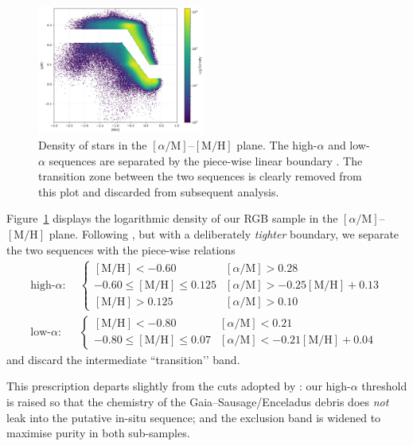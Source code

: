 \documentclass[a4paper,12pt]{article}
\begin{document}
\begin{figure}[h]
    \centering
    \includegraphics[width=0.49\textwidth]{../figures/alpha_vs_metalicity.png}
    \caption{Density of stars in the $[\alpha/\mathrm{M}]$–$[\mathrm{M/H}]$ plane.
             The high-$\alpha$ and low-$\alpha$ sequences are separated by the
             piece-wise linear boundary . The transition zone
             between the two sequences is clearly removed from this plot and discarded from
             subsequent analysis.}
    \label{fig:alphametal}
\end{figure}


  
Figure~\ref{fig:alphametal} displays the logarithmic density of our
RGB sample in the $[\alpha/\mathrm{M}]$–$[\mathrm{M/H}]$ plane.  Following
\citet{Chandra_2024}, but with a deliberately \emph{tighter} boundary, we
separate the two sequences with the piece-wise relations
%
\[
\begin{aligned}
\text{high-}\alpha:\;&
  \begin{cases}
    [\mathrm{M/H}]<-0.60 &
      [\alpha/\mathrm{M}]>0.28\\
    -0.60\le[\mathrm{M/H}]\le0.125 &
      [\alpha/\mathrm{M}]>-0.25[\mathrm{M/H}]+0.13\\
    [\mathrm{M/H}]>0.125 &
      [\alpha/\mathrm{M}]>0.10
  \end{cases}\\[4pt]
\text{low-}\alpha:\;&
  \begin{cases}
    [\mathrm{M/H}]<-0.80 &
      [\alpha/\mathrm{M}]<0.21\\
    -0.80\le[\mathrm{M/H}]\le0.07 &
      [\alpha/\mathrm{M}]<-0.21[\mathrm{M/H}]+0.04
  \end{cases}
\end{aligned}
\]
%
and discard the intermediate “transition’’ band.

This prescription departs slightly from the cuts adopted by
\citet{Chandra_2024}:  
our high-$\alpha$ threshold is raised so that the
chemistry of the Gaia–Sausage/Enceladus debris
\citep{Belokurov2018,Helmi2018} does \emph{not} leak into the putative
in-situ sequence;  
and the exclusion band is widened to maximise purity in both
sub-samples.  
\end{document}
